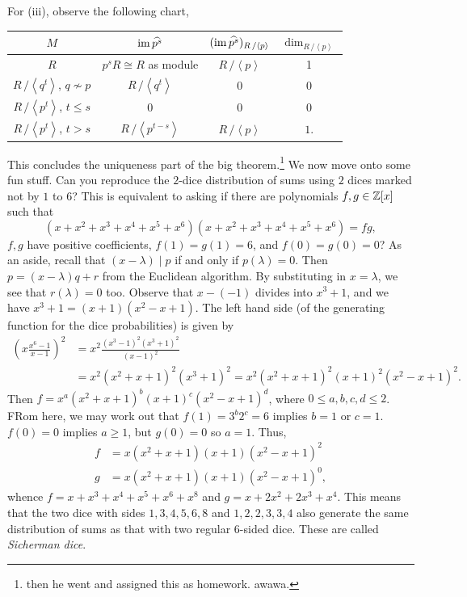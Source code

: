 For (iii), observe the following chart,
\begin{center}
    \begin{tabular}{c|c|c|c}
        $M$ & $\operatorname{im} \widehat{p^s}$ & $(\operatorname{im} \widehat{p^s})_{R\,/\left<p\right>}$ & $\dim_{R\,/\left<p\right>}$ \\ \hline
        $R$ & $p^s R \cong R$ as module & $R \,/\! \left<p\right>$ & 1 \\ \hline
        $R\,/\!\left<q^t\right>$, $q \not\sim p$ & $R\,/\!\left<q^t\right>$ & $0$ & $0$ \\ \hline
        $R\,/\!\left<p^t\right>$, $t \leq s$ & $0$ & $0$ & $0$ \\ \hline
        $R\,/\!\left<p^t\right>$, $t > s$ & $R\,/\!\left<p^{t-s}\right>$ & $R\,/\!\left<p\right>$ & $1$.
    \end{tabular}
\end{center}
This concludes the uniqueness part of the big theorem.\footnote{then he went and assigned this as homework. awawa.}
We now move onto some fun stuff. Can you reproduce the $2$-dice distribution of sums using $2$ dices marked not by $1$ to $6$? This is equivalent to asking if there are polynomials $f, g \in \mathbb Z[x]$ such that
\[ (x + x^2 + x^3 + x^4 + x^5 + x^6)(x + x^2 + x^3 + x^4 + x^5 + x^6) = fg, \]
$f, g$ have positive coefficients, $f(1) = g(1) = 6$, and $f(0) = g(0) = 0$? As an aside, recall that $(x - \lambda) \mid p$ if and only if $p(\lambda) = 0$. Then $p = (x - \lambda) q + r$ from the Euclidean algorithm. By substituting in $x = \lambda$, we see that $r(\lambda) = 0$ too. Observe that $x-(-1)$ divides into $x^3 + 1$, and we have $x^3 + 1 = (x + 1)(x^2 - x + 1)$. The left hand side (of the generating function for the dice probabilities) is given by
\begin{align*}
    \left(x \frac{x^6 - 1}{x - 1}\right)^2 &= x^2 \frac{(x^3 - 1)^2 (x^3 + 1)^2}{(x - 1)^2} \\
    &= x^2(x^2 + x + 1)^2 (x^3 + 1)^2 = x^2 (x^2 + x + 1)^2 (x + 1)^2 (x^2 - x + 1)^2.
\end{align*}
Then $f = x^a (x^2 + x + 1)^b (x + 1)^c (x^2 - x + 1)^d$, where $0 \leq a, b, c, d \leq 2$. FRom here, we may work out that $f(1) = 3^b 2^c = 6$ implies $b = 1$ or $c = 1$. $f(0) = 0$ implies $a \geq 1$, but $g(0) = 0$ so $a = 1$. Thus,
\begin{align*}
    f &= x(x^2 + x + 1)(x + 1)(x^2 - x + 1)^2 \\
    g &= x(x^2 + x + 1)(x + 1)(x^2 - x + 1)^0,
\end{align*}
whence $f = x + x^3 + x^4 + x^5 + x^6 + x^8$ and $g = x + 2x^2 + 2x^3 + x^4$. This means that the two dice with sides $1, 3, 4, 5, 6, 8$ and $1, 2, 2, 3, 3, 4$ also generate the same distribution of sums as that with two regular $6$-sided dice. These are called \textit{Sicherman dice}.
